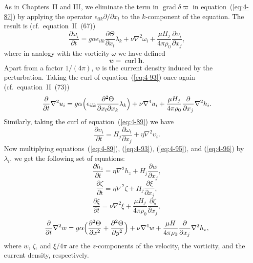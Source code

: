 As in Chapters~II and III, we eliminate the term in $\operatorname{grad}\delta\varpi$ in equation~(\ref{eq:4-87}) by applying the operator $\epsilon_{ilk}\partial/\partial x_l$ to the $k$-component of the equation. The result is (cf.\ equation~II~(67))
\begin{equation}
\label{eq:4-93}
\frac{\partial\omega_i}{\partial t} = g\alpha\epsilon_{ilk}\frac{\partial\Theta}{\partial x_l}\lambda_k+\nu\nabla^2\omega_i+\frac{\mu H_j}{4\pi\rho_0}\frac{\partial\upsilon_i}{\partial x_j},
\end{equation}
where in analogy with the vorticity $\omega$ we have defined
\begin{equation}
\label{eq:4-94}
\boldsymbol{\upsilon} = \operatorname{curl}\mathbf{h}.
\end{equation}
Apart from a factor $1/(4\pi)$, $\boldsymbol{\upsilon}$ is the current density induced by the perturbation. Taking the curl of equation~(\ref{eq:4-93}) once again (cf.\ equation~II~(73))
\begin{equation}
\label{eq:4-95}
\frac{\partial}{\partial t}\nabla^2 u_i = g\alpha\Bigl(\epsilon_{ilk}\frac{\partial^2\Theta}{\partial x_l\partial x_k}\lambda_k\Bigr)+\nu\nabla^4 u_i+\frac{\mu H_j}{4\pi\rho_0}\frac{\partial}{\partial x_j}\nabla^2 h_i.
\end{equation}
Similarly, taking the curl of equation~(\ref{eq:4-89}) we have
\begin{equation}
\label{eq:4-96}
\frac{\partial\upsilon_i}{\partial t} = H_j\frac{\partial\omega_i}{\partial x_j}+\eta\nabla^2\upsilon_i.
\end{equation}
Now multiplying equations~(\ref{eq:4-89}), (\ref{eq:4-93}), (\ref{eq:4-95}), and (\ref{eq:4-96}) by $\lambda_i$, we get the following set of equations:
\begin{equation}
\label{eq:4-97}
\frac{\partial h_z}{\partial t} = \eta\nabla^2 h_z + H_j\frac{\partial w}{\partial x_j},
\end{equation}
\begin{equation}
\label{eq:4-98}
\frac{\partial\zeta}{\partial t} = \eta\nabla^2\zeta + H_j\frac{\partial\xi}{\partial x_j},
\end{equation}
\begin{equation}
\label{eq:4-99}
\frac{\partial\xi}{\partial t} = \nu\nabla^2\xi+\frac{\mu H_j}{4\pi\rho_0}\frac{\partial\zeta}{\partial x_j},
\end{equation}
\begin{equation}
\label{eq:4-100}
\frac{\partial}{\partial t}\nabla^2 w = g\alpha\Bigl(\frac{\partial^2\Theta}{\partial x^2}+\frac{\partial^2\Theta}{\partial y^2}\Bigr)+\nu\nabla^4 w+\frac{\mu H}{4\pi\rho_0}\frac{\partial}{\partial x_j}\nabla^2 h_z,
\end{equation}
where $w$, $\zeta$, and $\xi/4\pi$ are the $z$-components of the velocity, the vorticity, and the current density, respectively.

